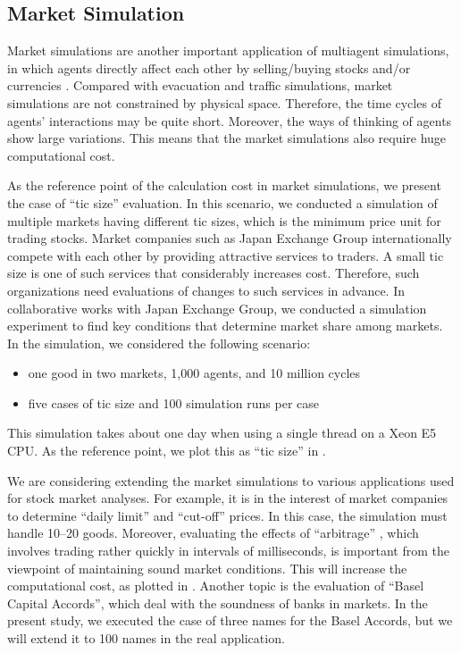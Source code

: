 \subsection{Market Simulation}

Market simulations are another important application of multiagent
simulations,
in which agents directly affect each other by selling/buying stocks
and/or currencies \cite{Kawakubo2014a}.
Compared with evacuation and traffic simulations,
market simulations are not constrained by physical space.
Therefore, the time cycles of agents' interactions may be quite short.
Moreover, the ways of thinking of agents show large variations.
This means that the market simulations also require huge
computational cost.

As the reference point of the calculation cost in market simulations,
we present the case of ``tic size'' evaluation.
In this scenario, we conducted a simulation of multiple markets
having different tic sizes,
which is the minimum price unit for trading stocks.
Market companies such as Japan Exchange Group internationally compete
with each other by providing attractive services to traders.
A small tic size
is one of such services that  considerably increases cost.
Therefore, such organizations need evaluations of changes to such services in advance.
In collaborative works with Japan Exchange Group, we conducted a
simulation experiment to find key conditions that determine market share
among markets.
In the simulation, we considered the following scenario:
\begin{itemize}
  \item one good in two markets, 1,000 agents, and 10 million cycles
  \item five cases of tic size and 100 simulation runs per case
\end{itemize}
This simulation takes about one day when using a single thread on a Xeon E5 CPU.
As the reference point, we plot this as ``tic size'' in .

We are considering extending the market simulations to various
applications used for stock market analyses.
For example, it is in the interest of market companies 
to determine ``daily limit'' and ``cut-off'' prices\cite{Mizuta2013a}.
In this case, the simulation must handle 10--20 goods.
Moreover, evaluating the effects of ``arbitrage'' \cite{Kawakubo2014a}, 
which involves trading rather quickly in intervals of milliseconds,
is important from the viewpoint of maintaining sound market conditions.
This will increase the computational cost, as plotted in .
Another topic is the evaluation of ``Basel Capital Accords'',
which deal with the soundness of banks in markets.
In the present study, we executed the case of three names for the Basel Accords,
but we will extend it to 100 names in the real application.

